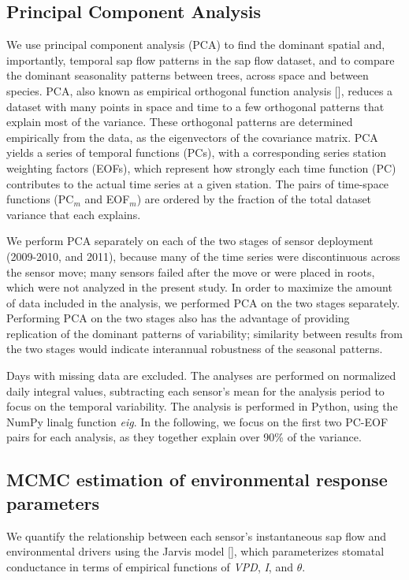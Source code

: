 \subsection{Principal Component Analysis}
\label{sec:pca}
We use principal component analysis (PCA) to find the dominant spatial and, importantly, temporal sap flow patterns in the sap flow dataset, and to compare the dominant seasonality patterns between trees, across space and between species.  PCA, also known as empirical orthogonal function analysis [\cite{lorenz1956empirical}], reduces a dataset with many points in space and time to a few orthogonal patterns that explain most of the variance. These orthogonal patterns are determined empirically from the data, as the eigenvectors of the covariance matrix.  PCA yields a series of temporal functions (PCs), with a corresponding series station weighting factors (EOFs), which represent how strongly each time function (PC) contributes to the actual time series at a given station.  The pairs of time-space functions (PC$_m$ and EOF$_m$) are ordered by the fraction of the total dataset variance that each explains.

We perform PCA separately on each of the two stages of sensor deployment (2009-2010, and 2011), because many of the time series were discontinuous across the sensor move; many sensors failed after the move or were placed in roots, which were not analyzed in the present study.  In order to maximize the amount of data included in the analysis, we performed PCA on the two stages separately.  Performing PCA on the two stages also has the advantage of providing replication of the dominant patterns of variability; similarity between results from the two stages would indicate interannual robustness of the seasonal patterns.

Days with missing data are excluded.  The analyses are performed on normalized daily integral values, subtracting each sensor's mean for the analysis period to focus on the temporal variability. The analysis is performed in Python, using the NumPy linalg function \textit{eig}. In the following, we focus on the first two PC-EOF pairs for each analysis, as they together explain over 90\% of the variance.

\subsection{MCMC estimation of environmental response parameters}
\label{sec:mcmc}
We quantify the relationship between each sensor's instantaneous sap flow and environmental drivers using the Jarvis model [\cite{jarvis1976interpretation}], which parameterizes stomatal conductance in terms of empirical functions of \textit{VPD}, \textit{I}, and $\theta$.

